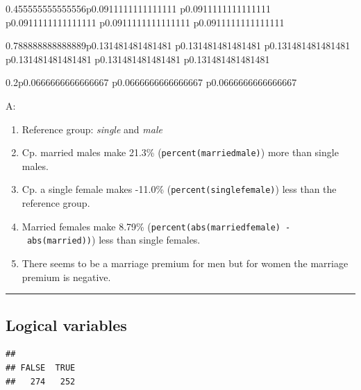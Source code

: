 \documentclass[]{book}
\newenvironment{Shaded}{\begin{snugshade}}{\end{snugshade}}
\newcommand{\CommentTok}[1]{\textcolor[rgb]{0.56,0.35,0.01}{\textit{#1}}}
\newcommand{\KeywordTok}[1]{\textcolor[rgb]{0.13,0.29,0.53}{\textbf{#1}}}
\newcommand{\NormalTok}[1]{#1}
\newcommand{\OperatorTok}[1]{\textcolor[rgb]{0.81,0.36,0.00}{\textbf{#1}}}
\newcommand{\StringTok}[1]{\textcolor[rgb]{0.31,0.60,0.02}{#1}}
\providecommand{\tightlist}{%
  \setlength{\itemsep}{0pt}\setlength{\parskip}{0pt}}
\begin{document}
\begin{tabularx}{0.455555555555556\textwidth}{p{0.0911111111111111\textwidth} p{0.0911111111111111\textwidth} p{0.0911111111111111\textwidth} p{0.0911111111111111\textwidth} p{0.0911111111111111\textwidth}}
\begin{tabularx}{0.788888888888889\textwidth}{p{0.131481481481481\textwidth} p{0.131481481481481\textwidth} p{0.131481481481481\textwidth} p{0.131481481481481\textwidth} p{0.131481481481481\textwidth} p{0.131481481481481\textwidth}}
\begin{tabularx}{0.2\textwidth}{p{0.0666666666666667\textwidth} p{0.0666666666666667\textwidth} p{0.0666666666666667\textwidth}}
\begin{Shaded}
\begin{Highlighting}[]
{{{{{{{{{{{\StringTok{  }\NormalTok{dplyr}\OperatorTok{::}\KeywordTok{select}\NormalTok{(estimate) }\OperatorTok{%
\StringTok{  }\KeywordTok{pull}\NormalTok{() }\CommentTok{# pull out the single coefficient value of the dataframe}
\end{Highlighting}
\end{Shaded}

A:

\begin{enumerate}
\def\labelenumi{\arabic{enumi}.}
\tightlist
\item
  Reference group: \emph{single} and \emph{male}
\item
  Cp. married males make 21.3\% (\texttt{percent(marriedmale)}) more
  than single males.
\item
  Cp. a single female makes -11.0\% (\texttt{percent(singlefemale)})
  less than the reference group.
\item
  Married females make 8.79\%
  (\texttt{percent(abs(marriedfemale)\ -\ abs(married))}) less than
  single females.
\item
  There seems to be a marriage premium for men but for women the
  marriage premium is negative.
\end{enumerate}

\begin{center}\rule{0.5\linewidth}{\linethickness}\end{center}

\hypertarget{logical-variables}{%
\subsection{Logical variables}\label{logical-variables}}

\begin{Shaded}
\end{Shaded}

\begin{verbatim}
## 
## FALSE  TRUE 
##   274   252
\end{verbatim}


\end{tabularx}
\end{tabularx}
\end{tabularx}
\end{document}
